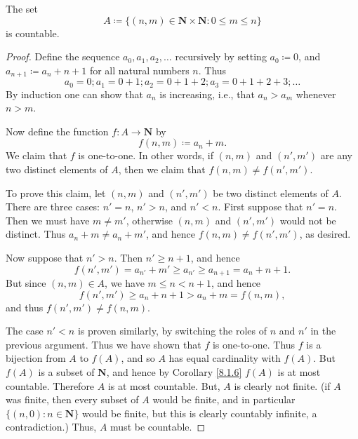 \begin{lemma}\label{8.1.12}
    The set
    \[
        A \coloneqq \{(n, m) \in \mathbf{N} \times \mathbf{N} : 0 \leq m \leq n\}
    \]
    is countable.
\end{lemma}

\begin{proof}
    Define the sequence \(a_0, a_1, a_2, \dots\) recursively by setting \(a_0 \coloneqq 0\), and \(a_{n + 1} \coloneqq a_n + n + 1\) for all natural numbers \(n\).
    Thus
    \[
        a_0 = 0; a_1 = 0 + 1; a_2 = 0 + 1 + 2; a_3 = 0 + 1 + 2 + 3; \dots
    \]
    By induction one can show that \(a_n\) is increasing, i.e., that \(a_n > a_m\) whenever \(n > m\).

    Now define the function \(f : A \to \mathbf{N}\) by
    \[
        f(n, m) \coloneqq a_n + m.
    \]
    We claim that \(f\) is one-to-one.
    In other words, if \((n, m)\) and \((n', m')\) are any two distinct elements of \(A\), then we claim that \(f(n, m) \neq f(n', m')\).

    To prove this claim, let \((n, m)\) and \((n', m')\) be two distinct elements of \(A\).
    There are three cases: \(n' = n\), \(n' > n\), and \(n' < n\).
    First suppose that \(n' = n\).
    Then we must have \(m \neq m'\), otherwise \((n, m)\) and \((n', m')\) would not be distinct.
    Thus \(a_n + m \neq a_n + m'\), and hence \(f(n, m) \neq f(n', m')\), as desired.

    Now suppose that \(n' > n\).
    Then \(n' \geq n + 1\), and hence
    \[
        f(n', m') = a_{n'} + m' \geq a_{n'} \geq a_{n + 1} = a_n + n + 1.
    \]
    But since \((n, m) \in A\), we have \(m \leq n < n + 1\), and hence
    \[
        f(n', m') \geq a_n + n + 1 > a_n + m = f(n, m),
    \]
    and thus \(f(n', m') \neq f(n, m)\).

    The case \(n' < n\) is proven similarly, by switching the roles of \(n\) and \(n'\) in the previous argument.
    Thus we have shown that \(f\) is one-to-one.
    Thus \(f\) is a bijection from \(A\) to \(f(A)\), and so \(A\) has equal cardinality with \(f(A)\).
    But \(f(A)\) is a subset of \(\mathbf{N}\), and hence by Corollary \ref{8.1.6} \(f(A)\) is at most countable.
    Therefore \(A\) is at most countable.
    But, \(A\) is clearly not finite.
    (if \(A\) was finite, then every subset of \(A\) would be finite, and in particular \(\{(n, 0) : n \in \mathbf{N}\}\) would be finite, but this is clearly countably infinite, a contradiction.)
    Thus, \(A\) must be countable.
\end{proof}

